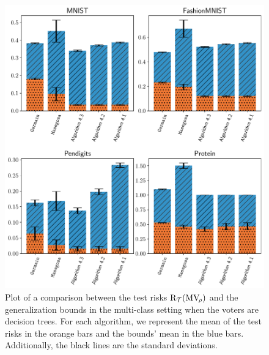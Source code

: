\begin{figure}
    \centering
    \includegraphics[width=1.0\linewidth]{chapter_4/figures/tree_multi_1.pdf}
    \caption[Comparison Between the Test Risks and the Bounds (5/6)]{
    Plot of a comparison between the test risks $\text{R}_{\mathcal{T}}(\text{MV}_{\!\rho})$ and the generalization bounds in the multi-class setting when the voters are decision trees.
    For each algorithm, we represent the mean of the test risks in the orange bars and the bounds' mean in the blue bars.
    Additionally, the black lines are the standard deviations. 
    }
    \label{chap:mv:fig:tree-multi-1}
\end{figure}

